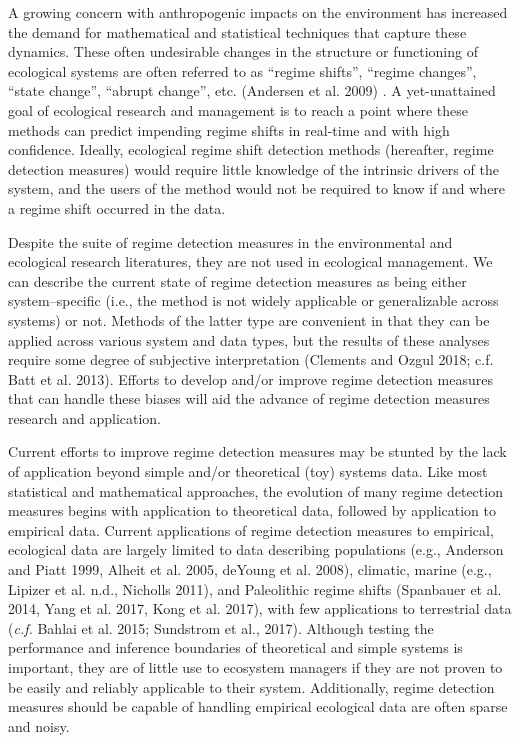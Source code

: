 \documentclass[12pt,twoside,openany]{reedthesis}
\begin{document}
A growing concern with anthropogenic impacts on the environment has
increased the demand for mathematical and statistical techniques that
capture these dynamics. These often undesirable changes in the structure
or functioning of ecological systems are often referred to as ``regime
shifts'', ``regime changes'', ``state change'', ``abrupt change'', etc.
(Andersen et al. 2009) . A yet-unattained goal of ecological research
and management is to reach a point where these methods can predict
impending regime shifts in real-time and with high confidence. Ideally,
ecological regime shift detection methods (hereafter, regime detection
measures) would require little knowledge of the intrinsic drivers of the
system, and the users of the method would not be required to know if and
where a regime shift occurred in the data.

Despite the suite of regime detection measures in the environmental and
ecological research literatures, they are not used in ecological
management. We can describe the current state of regime detection
measures as being either system--specific (i.e., the method is not
widely applicable or generalizable across systems) or not. Methods of
the latter type are convenient in that they can be applied across
various system and data types, but the results of these analyses require
some degree of subjective interpretation (Clements and Ozgul 2018; c.f.
Batt et al. 2013). Efforts to develop and/or improve regime detection
measures that can handle these biases will aid the advance of regime
detection measures research and application.

Current efforts to improve regime detection measures may be stunted by
the lack of application beyond simple and/or theoretical (toy) systems
data. Like most statistical and mathematical approaches, the evolution
of many regime detection measures begins with application to theoretical
data, followed by application to empirical data. Current applications of
regime detection measures to empirical, ecological data are largely
limited to data describing populations (e.g., Anderson and Piatt 1999,
Alheit et al. 2005, deYoung et al. 2008), climatic, marine (e.g.,
Lipizer et al. n.d., Nicholls 2011), and Paleolithic regime shifts
(Spanbauer et al. 2014, Yang et al. 2017, Kong et al. 2017), with few
applications to terrestrial data (\emph{c.f.} Bahlai et al. 2015;
Sundstrom et al., 2017). Although testing the performance and inference
boundaries of theoretical and simple systems is important, they are of
little use to ecosystem managers if they are not proven to be easily and
reliably applicable to their system. Additionally, regime detection
measures should be capable of handling empirical ecological data are
often sparse and noisy.
\end{document}
